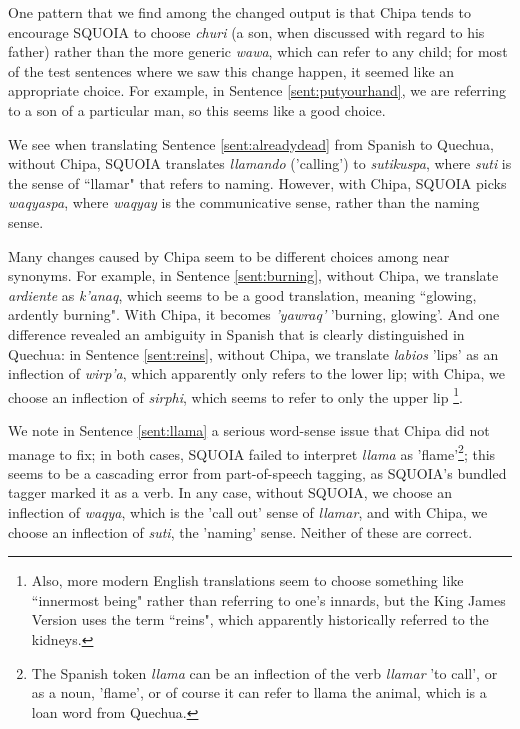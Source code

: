 
One pattern that we find among the changed output is that Chipa tends to
encourage SQUOIA to choose \emph{churi} (a son, when discussed with regard to
his father) rather than the more generic \emph{wawa}, which can refer to any
child; for most of the test sentences where we saw this change happen, it
seemed like an appropriate choice. For example, in Sentence
\ref{sent:putyourhand}, we are referring to a son of a particular man, so this
seems like a good choice.

We see when translating Sentence \ref{sent:alreadydead}  from Spanish to
Quechua, without Chipa, SQUOIA translates \emph{llamando} ('calling') to
\emph{sutikuspa}, where \emph{suti} is the sense of ``llamar" that refers to
naming. However, with Chipa, SQUOIA picks \emph{waqyaspa}, where \emph{waqyay}
is the communicative sense, rather than the naming sense.

Many changes caused by Chipa seem to be different choices among near synonyms.
For example, in Sentence \ref{sent:burning}, without Chipa, we translate
\emph{ardiente} as \emph{k'anaq}, which seems to be a good translation, meaning
``glowing, ardently burning". With Chipa, it becomes \emph{'yawraq'} 'burning,
glowing'. And one difference revealed an ambiguity in Spanish that is clearly
distinguished in Quechua: in Sentence \ref{sent:reins}, without Chipa, we
translate \emph{labios} 'lips' as an inflection of \emph{wirp'a}, which
apparently only refers to the lower lip; with Chipa, we choose an inflection of
\emph{sirphi}, which seems to refer to only the upper lip
\footnote{Also, more modern English translations seem to choose something like
``innermost being" rather than referring to one's innards, but the King James
Version uses the term ``reins", which apparently historically referred to the
kidneys.}.

We note in Sentence \ref{sent:llama} a serious word-sense issue that Chipa did
not manage to fix; in both cases, SQUOIA failed to interpret \emph{llama} as
'flame'\footnote{The Spanish token \emph{llama} can be an inflection of the
verb \emph{llamar} 'to call', or as a noun, 'flame', or of course it can refer
to llama the animal, which is a loan word from Quechua.}; this seems to be a
cascading error from part-of-speech tagging, as SQUOIA's bundled tagger marked
it as a verb. In any case, without SQUOIA, we choose an inflection of
\emph{waqya}, which is the 'call out' sense of \emph{llamar}, and with Chipa,
we choose an inflection of \emph{suti}, the 'naming' sense. Neither of these
are correct.

